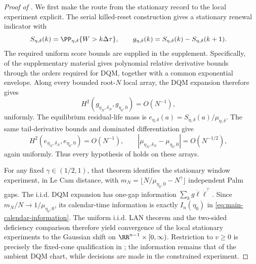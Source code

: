 \begin{proof}[Proof of ]
We first make the route from the stationary record to the local experiment
explicit.  The serial killed-reset construction gives a stationary renewal
indicator with
\begin{equation}
 S_{\eta,\delta}(k)=\PP_{\eta,\delta}\{W>k\Delta\tau\},\qquad
 g_{\eta,\delta}(k)=S_{\eta,\delta}(k)-S_{\eta,\delta}(k+1).
\label{eq:main-sampled-gap}
\end{equation}
The required uniform score bounds are supplied in the supplement.
Specifically,  of the supplementary material gives polynomial relative
derivative bounds through the orders required for DQM, together with a common
exponential envelope.  Along every bounded root-\(N\) local array, the DQM
expansion therefore gives
\begin{equation}
 H^2(g_{\eta_N,\delta_N},g_{\eta_0,0})=O(N^{-1}),
\label{eq:main-gap-hellinger}
\end{equation}
uniformly.  The equilibrium residual-life mass is
\(e_{\eta,\delta}(a)=S_{\eta,\delta}(a)/\mu_{\eta,\delta}\).  The same
tail-derivative bounds and dominated differentiation give
\begin{equation}
 H^2(e_{\eta_N,\delta_N},e_{\eta_0,0})=O(N^{-1}),\qquad
 |\mu_{\eta_N,\delta_N}-\mu_{\eta_0,0}|=O(N^{-1/2}),
\label{eq:main-equilibrium-hellinger}
\end{equation}
again uniformly.  Thus every hypothesis of
 holds on these arrays.

For any fixed \(\gamma\in(1/2,1)\), that theorem identifies the stationary
window experiment, in Le Cam distance, with
\(m_N=\lfloor N/\mu_{\eta_0,0}-N^\gamma\rfloor\) independent Palm gaps.
The i.i.d. DQM expansion has one-gap information
\(\sum_k g\dot\ell\dot\ell^\top\).  Since
\(m_N/N\to1/\mu_{\eta_0,0}\), its calendar-time information is exactly
\(I_n(\eta_0)\) in \eqref{eq:main-calendar-information}.  The uniform i.i.d. LAN theorem and the
two-sided deficiency comparison therefore yield convergence of the local
stationary experiments to the Gaussian shift on
\(\RR^{n-1}\times[0,\infty)\).  Restriction to \(v\ge0\) is precisely the
fixed-cone qualification in ;
the information remains that of the ambient DQM chart, while decisions are
made in the constrained experiment.


\end{proof}
